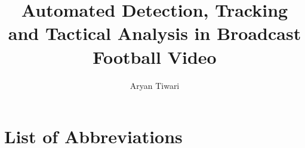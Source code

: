 \documentclass[12pt,BSc,wordcount,oneside]{muthesis}
\begin{document}

\title{Automated Detection, Tracking and Tactical Analysis in Broadcast Football Video}
\author{Aryan Tiwari}

\beforeabstract

\chapter*{List of Abbreviations}




\afterabstract



\afterpreface
\pagestyle{plain}










% 
\end{document}
